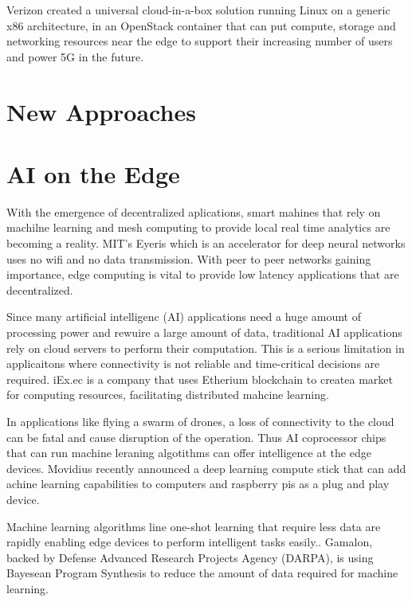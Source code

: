\documentclass[sigconf]{acmart}
\begin{document}
Verizon created a universal cloud-in-a-box solution running Linux on a generic x86 architecture, in an OpenStack container that can put compute, storage and networking resources near the edge to support their increasing number of users and power 5G in the future.\cite{open_stack_living_on_edge}\cite{open_stack_verizon}

\section{New Approaches}
\cite{ieee-serverless-platform-edge}
\cite{FADES-offloading}


\section{AI on the Edge}
With the emergence of decentralized aplications, smart mahines that rely on machilne learning and mesh computing to provide local real time analytics are becoming a reality. MIT's Eyeris which is an accelerator for deep neural networks uses no wifi and no data transmission. With peer to peer networks gaining importance, edge computing is vital to provide low latency applications that are decentralized. \cite{ibm_iot_edge}

Since many artificial intelligenc (AI) applications need a huge amount of processing power and rewuire a large amount of data, traditional AI applications rely on cloud servers to perform their computation. This is a serious limitation in applicaitons where connectivity is not reliable and time-critical decisions are required. \cite{ai-to-edge}iEx.ec is a company that uses Etherium blockchain to createa market for computing resources, facilitating distributed mahcine learning. \cite{iExec}

In applications like flying a swarm of drones, a loss of connectivity to the cloud can be fatal and cause disruption of the operation. Thus AI coprocessor chips that can run machine leraning algotithms can offer intelligence at the edge devices. Movidius recently announced a deep learning compute stick that can add achine learning capabilities to computers and raspberry pis as a plug and play device.\cite{ai-to-edge}

Machine learning algorithms line one-shot learning that require less data are rapidly enabling edge devices to perform intelligent tasks easily.\cite{wiki-one-shot-learning}.
Gamalon, backed by Defense Advanced Research Projects Agency (DARPA), is using Bayesean Program Synthesis to reduce the amount of data required for machine learning.\cite{ai-to-edge}  
\end{document}
